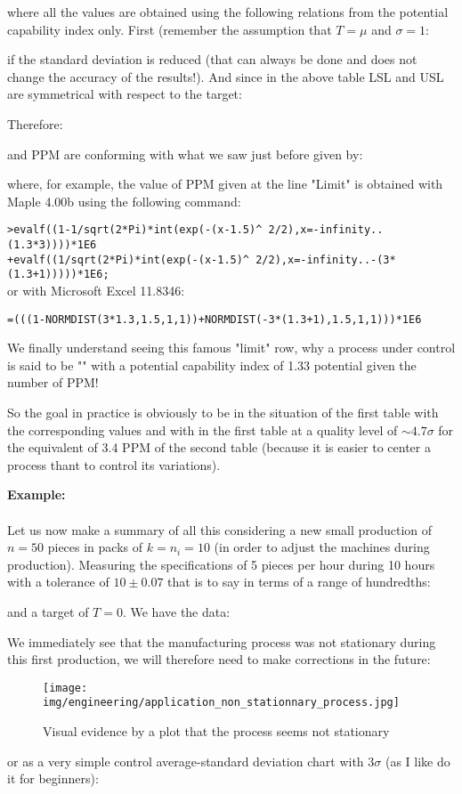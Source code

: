 \begin{enumerate}
	where all the values are obtained using the following relations from the potential capability index only. First (remember the assumption that $T=\mu$ and $\sigma=1$:
	
	if the standard deviation is reduced (that can always be done and does not change the accuracy of the results!). And since in the above table LSL and USL are symmetrical with respect to the target:
	
	Therefore:
	
	and PPM are conforming with what we saw just before given by:
	
where, for example, the value of PPM given at the line "Limit" is obtained with Maple 4.00b using the following command:

	\texttt{>evalf((1-1/sqrt(2*Pi)*int(exp(-(x-1.5)\string^ 2/2),x=-infinity..(1.3*3))))*1E6}\\
	\texttt{+evalf((1/sqrt(2*Pi)*int(exp(-(x-1.5)\string^ 2/2),x=-infinity..-(3*(1.3+1)))))*1E6;}\\
	
	or with Microsoft Excel 11.8346:
\begin{center}
	\texttt{=(((1-NORMDIST(3*1.3,1.5,1,1))+NORMDIST(-3*(1.3+1),1.5,1,1)))*1E6}
\end{center}
	\end{enumerate}	
	
	We finally understand seeing this famous "limit" row, why a process under control is said to be "" with a potential capability index of 1.33 potential given the number of PPM!
	
	So the goal in practice is obviously to be in the situation of the first table with the corresponding values and with in the first table at a quality level of $\sim4.7\sigma$ for the equivalent of 3.4 PPM of the second table (because it is easier to center a process thant to control its variations).
	
	\begin{tcolorbox}[colframe=black,colback=white,sharp corners]
	\textbf{{\Large {}}Example:}\\\\
	Let us now make a summary of all this considering a new small production of $n=50$ pieces in packs of $k=n_i=10$ (in order to adjust the machines during production). Measuring the specifications of 5 pieces per hour during 10 hours with a tolerance of $10\pm0.07$ that is to say in terms of a range of hundredths:
	
	and a target of $T=0$. We have the data:
	
	We immediately see that the manufacturing process was not stationary during this first production, we will therefore need to make corrections in the future:
	\begin{figure}[H]
		\centering
		\texttt{[image: img/engineering/application\_non\_stationnary\_process.jpg]}
		\caption[]{Visual evidence by a plot that the process seems not stationary}
	\end{figure}
	or as a very simple control average-standard deviation chart with $3\sigma$ (as I like do it for beginners):
	\end{tcolorbox}
	
